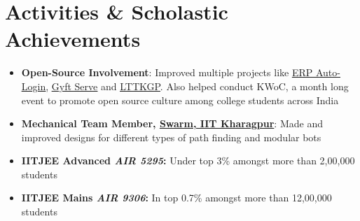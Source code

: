 \documentclass[letterpaper,11pt]{article}
\begin{document}
\section{Activities \& Scholastic Achievements}
\begin{itemize}[leftmargin=0.15in, label={}]
\item \textbf{Open-Source Involvement}: Improved multiple projects like {\href{https://github.com/metakgp/erp-auto-login} {\underline{ERP Auto-Login}}}, {\href {https://github.com/metakgp/gyft-serve}{\underline{Gyft Serve}}} and {\href{https://github.com/lttkgp}{\underline{LTTKGP}}}. Also helped conduct KWoC, a month long event to promote open source culture among college students across India

\item\textbf{Mechanical Team Member, {\href{https://swarm-iitkgp.github.io/}{Swarm, IIT Kharagpur}}}: Made and improved designs for different types of path finding and modular bots

\item\textbf{IITJEE Advanced \emph{AIR 5295}:} Under top 3\% amongst more than 2,00,000 students 

\item\textbf{IITJEE Mains \emph{AIR 9306}:} In top 0.7\% amongst more than 12,00,000 students

\end{itemize}


\end{document}
